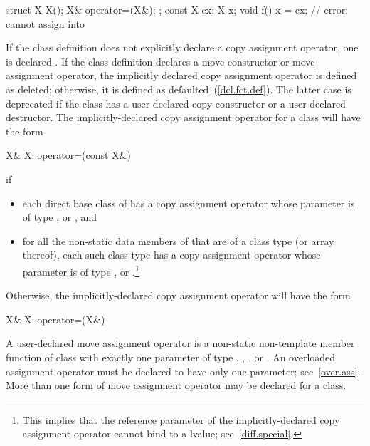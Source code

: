 \begin{codeblock}
struct X {
  X();
  X& operator=(X&);
};
const X cx;
X x;
void f() {
  x = cx;           // error:  cannot assign  into 
}
\end{codeblock}
\exitexample
\exitnote

\pnum
{}%
If the class definition does not explicitly declare a copy assignment operator,
one is declared . If the class definition declares a move
constructor or move assignment operator, the implicitly declared copy
assignment operator is defined as deleted; otherwise, it is defined as
defaulted~(\ref{dcl.fct.def}).
The latter case is deprecated if the class has a user-declared copy constructor
or a user-declared destructor.
The implicitly-declared copy assignment operator for a class
will have the form

\begin{codeblock}
X& X::operator=(const X&)
\end{codeblock}

if

\begin{itemize}
\item
each direct base class
of
has a copy assignment operator whose parameter is of type
,
or
,
and
\item
for all the non-static data members of
that are of a class type
(or array thereof),
each such class type has a copy assignment operator whose parameter is of type
,
or
.\footnote{This implies that the reference parameter of the
implicitly-declared copy assignment operator cannot bind to a
lvalue; see~\ref{diff.special}.}
\end{itemize}

Otherwise, the implicitly-declared copy
assignment operator
will have the form

\begin{codeblock}
X& X::operator=(X&)
\end{codeblock}

\pnum
A user-declared move assignment operator  is
a non-static non-template member function of class  with exactly
one parameter of type , , , or
. \enternote An overloaded assignment operator must be
declared to have only one parameter; see~\ref{over.ass}. \exitnote{}
\enternote More
than one form of move assignment operator may be declared for a class. \exitnote

